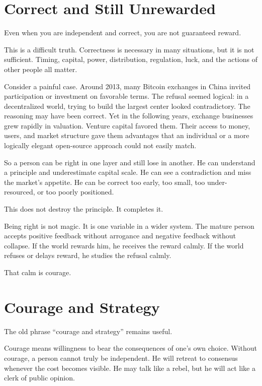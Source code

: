 \section*{Correct and Still Unrewarded}

Even when you are independent and correct, you are not guaranteed reward.

This is a difficult truth. Correctness is necessary in many situations, but it is not sufficient. Timing, capital, power, distribution, regulation, luck, and the actions of other people all matter.

Consider a painful case. Around 2013, many Bitcoin exchanges in China invited participation or investment on favorable terms. The refusal seemed logical: in a decentralized world, trying to build the largest center looked contradictory. The reasoning may have been correct. Yet in the following years, exchange businesses grew rapidly in valuation. Venture capital favored them. Their access to money, users, and market structure gave them advantages that an individual or a more logically elegant open-source approach could not easily match.

So a person can be right in one layer and still lose in another. He can understand a principle and underestimate capital scale. He can see a contradiction and miss the market's appetite. He can be correct too early, too small, too under-resourced, or too poorly positioned.

This does not destroy the principle. It completes it.

Being right is not magic. It is one variable in a wider system. The mature person accepts positive feedback without arrogance and negative feedback without collapse. If the world rewards him, he receives the reward calmly. If the world refuses or delays reward, he studies the refusal calmly.

That calm is courage.

\section*{Courage and Strategy}

The old phrase ``courage and strategy'' remains useful.

Courage means willingness to bear the consequences of one's own choice. Without courage, a person cannot truly be independent. He will retreat to consensus whenever the cost becomes visible. He may talk like a rebel, but he will act like a clerk of public opinion.

